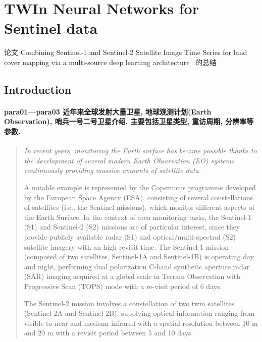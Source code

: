 \section{TWIn Neural Networks for Sentinel data}
论文 Combining Sentinel-1 and Sentinel-2  Satellite Image Time Series for land cover mapping via a multi-source deep learning architecture~\cite{TWINNS} 的总结

\subsection{Introduction}
\paragraph*{para01---para03
    \textcolor[RGB]{17, 205, 29}{近年来全球发射大量卫星, 地球观测计划(Earth Observation),  哨兵一号二号卫星介绍. 主要包括卫星类型, 重访周期, 分辨率等参数.}}
\begin{quotation}
    \itshape
    In recent years, monitoring the Earth surface has become possible thanks to the development of several modern Earth Observation (EO) systems continuously providing massive amounts of satellite data. 
    
    A notable example is represented by the Copernicus programme developed by the European Space Agency (ESA), consisting of several constellations of satellites (i.e., the Sentinel missions), which monitor different aspects of the Earth Surface. In the context of area monitoring tasks, the Sentinel-1 (S1) and Sentinel-2 (S2) missions are of particular interest, since they provide publicly available radar (S1) and optical/multi-spectral (S2) satellite imagery with an high revisit time. The Sentinel-1 mission (composed of two satellites, Sentinel-1A and Sentinel-1B) is operating day and night, performing dual polarization C-band synthetic aperture radar (SAR) imaging acquired at a global scale in Terrain Observation with Progressive Scan (TOPS) mode with a re-visit period of 6 days. 
    
    The Sentinel-2 mission involves a constellation of two twin satellites (Sentinel-2A and Sentinel-2B), supplying optical information ranging from visible to near and medium infrared with a spatial resolution between 10 m and 20 m with a revisit period between 5 and 10 days.
\end{quotation}

